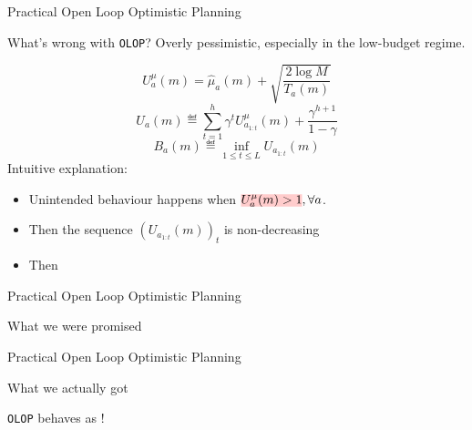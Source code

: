 \documentclass{beamer}
\begin{document}
\begin{frame}{Practical Open Loop Optimistic Planning}
    \begin{block}{What's wrong with \texttt{OLOP}? }
    Overly pessimistic, especially in the low-budget regime.
    \end{block}
    \begin{equation}
         U^{\mu}_a(m) = \hat{\mu}_a(m) + \sqrt{\frac{2 \log M}{T_a(m)}}
    \end{equation}
    \begin{equation}
    \label{eq:Ua}
        U_a(m) \eqdef \sum_{t=1}^h \gamma^t U^{\mu}_{a_{1:t}}(m) + \frac{\gamma^{h+1}}{1-\gamma}
    \end{equation}
    \begin{equation}
    \label{eq:Ba}
        B_a(m) \eqdef \inf_{1 \leq t \leq L} U_{a_{1:t}}(m)
    \end{equation}
    Intuitive explanation: 
    \begin{itemize}
        \item Unintended behaviour happens when $\hler{U^{\mu}_a(m) > 1}, \forall a$. 
        \item Then the sequence $(U_{a_{1:t}}(m))_t$ is non-decreasing
        \item Then 
    \end{itemize}
\end{frame}

\begin{frame}{Practical Open Loop Optimistic Planning}
\begin{block}{What we were promised}
\begin{center}

\end{center}
\end{block}
\end{frame}

\begin{frame}{Practical Open Loop Optimistic Planning}
\begin{block}{What we actually got}
\begin{center}

\end{center}
\end{block}
\begin{flushright}
\texttt{OLOP} behaves as !
\end{flushright}
\end{frame}
\end{document}
